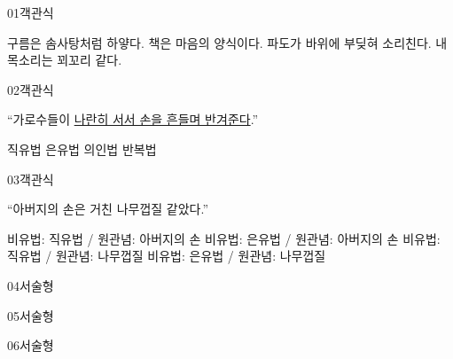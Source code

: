 \documentclass[fs95,seriesFre]{korfarm-base}
\begin{document}
\kfActivityBg \par{}\par\nopagebreak[4]\smallskip\nopagebreak[4]


\begin{kfQBlock}{01}{객관식}
\begin{kfChoices}
\kfChoice 구름은 솜사탕처럼 하얗다.
\kfChoice 책은 마음의 양식이다.
\kfChoice 파도가 바위에 부딪혀 소리친다.
\kfChoice 내 목소리는 꾀꼬리 같다.
\end{kfChoices}
\end{kfQBlock}
\begin{kfQBlock}{02}{객관식}
\begin{kfEvidence}“가로수들이 \uline{나란히 서서 손을 흔들며 반겨준다}.”\end{kfEvidence}
\begin{kfChoices}
\kfChoice 직유법
\kfChoice 은유법
\kfChoice 의인법
\kfChoice 반복법
\end{kfChoices}
\end{kfQBlock}
\begin{kfQBlock}{03}{객관식}
\begin{kfEvidence}“아버지의 손은 거친 나무껍질 같았다.”\end{kfEvidence}
\begin{kfChoices}
\kfChoice 비유법: 직유법 / 원관념: 아버지의 손
\kfChoice 비유법: 은유법 / 원관념: 아버지의 손
\kfChoice 비유법: 직유법 / 원관념: 나무껍질
\kfChoice 비유법: 은유법 / 원관념: 나무껍질
\end{kfChoices}
\end{kfQBlock}
\begin{kfQBlock}{04}{서술형}
\end{kfQBlock}
\begin{kfQBlock}{05}{서술형}
\end{kfQBlock}
\begin{kfQBlock}{06}{서술형}
\end{kfQBlock}
\end{document}
